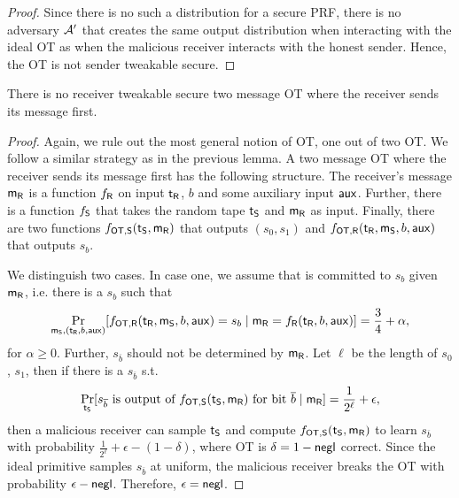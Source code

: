 \begin{proof}
Since there is no such a distribution for a secure PRF, there is no adversary $\mathcal{A}'$ that creates the same output distribution when interacting with the ideal OT as when the malicious receiver interacts with the honest sender. Hence, the OT is not sender tweakable secure. 
\end{proof}

\begin{lemma}
There is no receiver tweakable secure two message OT where the receiver sends its message first.
\end{lemma}

\begin{proof}
Again, we rule out the most general notion of OT, one out of two OT. We follow a similar strategy as in the previous lemma.
A two message OT where the receiver sends its message first has the following structure. The receiver's message $\mathsf{m}_{\mathsf{R}}$ is a function $f_{\mathsf{R}}$ on input $\mathsf{t}_{\mathsf{R}}$, $b$ and some auxiliary input $\mathsf{aux}$. Further, there is a function $f_{\mathsf{S}}$ that takes the random tape $\mathsf{t}_{\mathsf{S}}$ and $\mathsf{m}_{\mathsf{R}}$ as input. Finally, there are two functions $f_{\mathsf{OT},\mathsf{S}}(\mathsf{t}_{\mathsf{S}},\mathsf{m}_{\mathsf{R}})$ that outputs $(s_0,s_1)$ and $f_{\mathsf{OT},\mathsf{R}}(\mathsf{t}_{\mathsf{R}},\mathsf{m}_{\mathsf{S}},b,\mathsf{aux})$ that outputs $s_b$. 

We distinguish two cases. In case one,  we assume that \rec is committed to $s_b$ given $\mathsf{m}_{\mathsf{R}}$, i.e. there is a $s_b$ such that
$$
\Pr_{\mathsf{m}_{\mathsf{S}}, (\mathsf{t}_{\mathsf{R}},b,\mathsf{aux})}[f_{\mathsf{OT},\mathsf{R}}(\mathsf{t}_{\mathsf{R}},\mathsf{m}_{\mathsf{S}},b,\mathsf{aux})=s_b\mid \mathsf{m}_{\mathsf{R}}=f_{\mathsf{R}}(\mathsf{t}_{\mathsf{R}},b,\mathsf{aux})]=\frac{3}{4}+\alpha,
$$
for $\alpha\geq 0$.
Further, $s_{\overline b}$ should not be determined by $\mathsf{m}_{\mathsf{R}}$. Let $\ell$ be the length of $s_0$, $s_1$, then if there is a $s_{\overline b}$ s.t. 
$$
\Pr_{\mathsf{t}_{\mathsf{S}}}[s_{\overline b}\text{ is output of }f_{\mathsf{OT},\mathsf{S}}(\mathsf{t}_{\mathsf{S}},\mathsf{m}_{\mathsf{R}})\text{ for bit }\overline b\mid \mathsf{m}_{\mathsf{R}}]=\frac{1}{2^\ell}+\epsilon,
$$
then a malicious receiver can sample $\mathsf{t}_{\mathsf{S}}$ and compute $f_{\mathsf{OT},\mathsf{S}}(\mathsf{t}_{\mathsf{S}},\mathsf{m}_{\mathsf{R}})$ to learn $s_{\overline b}$ with probability $\frac{1}{2^\ell}+\epsilon-(1-\delta)$, where OT is $\delta=1-\mathsf{negl}$ correct. Since the ideal primitive samples $s_{\overline b}$ at uniform, the malicious receiver breaks the OT with probability $\epsilon-\mathsf{negl}$. Therefore, $\epsilon=\mathsf{negl}$. 


\end{proof}
